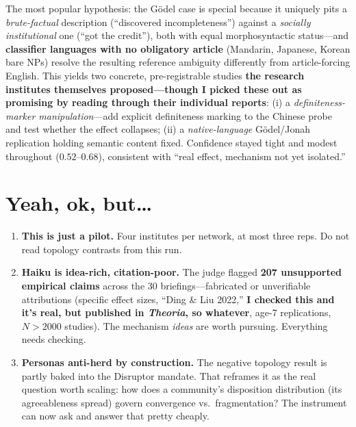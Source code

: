 \documentclass[11pt]{article}
\begin{document}
\medskip
The most popular hypothesis: the G\"odel case is special because it uniquely pits a \emph{brute-factual} description (``discovered incompleteness'') against a \emph{socially institutional} one (``got the credit''), both with equal morphosyntactic status---and \textbf{classifier languages with no obligatory article} (Mandarin, Japanese, Korean bare NPs) resolve the resulting reference ambiguity differently from article-forcing English. This yields two concrete, pre-registrable studies \textbf{the research institutes themselves proposed—though I picked these out as  promising by reading through their individual reports}: (i) a \emph{definiteness-marker manipulation}---add explicit definiteness marking to the Chinese probe and test whether the effect collapses; (ii) a \emph{native-language} G\"odel/Jonah replication holding semantic content fixed. Confidence stayed tight and modest throughout ($0.52$--$0.68$), consistent with ``real effect, mechanism not yet isolated.''

\section{Yeah, ok, but\dots}

\begin{enumerate}
\item \textbf{This is just a pilot.} Four institutes per network, at most three reps. Do not read topology contrasts from this run.
\item \textbf{Haiku is idea-rich, citation-poor.} The judge flagged \textbf{207 unsupported empirical claims} across the 30 briefings---fabricated or unverifiable attributions (specific effect sizes, ``Ding \& Liu 2022,'' \textbf{I checked this and it's real, but published in \emph{Theoria}, so whatever}, age-7 replications, $N>2000$ studies). The mechanism \emph{ideas} are worth pursuing. Everything needs checking. 
\item \textbf{Personas anti-herd by construction.} The negative topology result is partly baked into the Disruptor mandate. That reframes it as the real question worth scaling: how does a community's disposition distribution (its agreeableness spread) govern convergence vs.\ fragmentation? The instrument can now ask and answer that pretty cheaply.
\end{enumerate}
\end{document}
